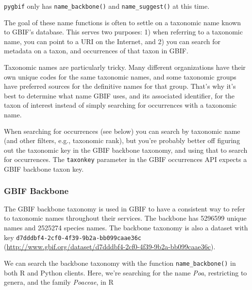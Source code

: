 \documentclass[author-year, review, 11pt]{components/elsarticle} %
\newenvironment{Shaded}{\begin{snugshade}}{\end{snugshade}}
\newcommand{\KeywordTok}[1]{\textcolor[rgb]{0.13,0.29,0.53}{\textbf{{#1}}}}
\newcommand{\DataTypeTok}[1]{\textcolor[rgb]{0.13,0.29,0.53}{{#1}}}
\newcommand{\StringTok}[1]{\textcolor[rgb]{0.31,0.60,0.02}{{#1}}}
\newcommand{\CommentTok}[1]{\textcolor[rgb]{0.56,0.35,0.01}{\textit{{#1}}}}
\newcommand{\NormalTok}[1]{{#1}}
\begin{document}
\texttt{pygbif} only has \texttt{name\_backbone()} and
\texttt{name\_suggest()} at this time.

The goal of these name functions is often to settle on a taxonomic name
known to GBIF's database. This serves two purposes: 1) when referring to
a taxonomic name, you can point to a URI on the Internet, and 2) you can
search for metadata on a taxon, and occurrences of that taxon in GBIF.

Taxonomic names are particularly tricky. Many different organizations
have their own unique codes for the same taxonomic names, and some
taxonomic groups have preferred sources for the definitive names for
that group. That's why it's best to determine what name GBIF uses, and
its associated identifier, for the taxon of interest instead of simply
searching for occurrences with a taxonomic name.

When searching for occurrences (see below) you can search by taxonomic
name (and other filters, e.g., taxonomic rank), but you're probably
better off figuring out the taxonomic key in the GBIF backbone taxonomy,
and using that to search for occurrences. The \texttt{taxonkey}
parameter in the GBIF occurrences API expects a GBIF backbone taxon key.

\subsubsection{GBIF Backbone}\label{gbif-backbone}

The GBIF backbone taxonomy is used in GBIF to have a consistent way to
refer to taxonomic names throughout their services. The backbone has
5296599 unique names and 2525274 species names. The backbone taxonomy is
also a dataset with key \texttt{d7dddbf4-2cf0-4f39-9b2a-bb099caae36c}
(\url{http://www.gbif.org/dataset/d7dddbf4-2cf0-4f39-9b2a-bb099caae36c}).

We can search the backbone taxonomy with the function
\texttt{name\_backbone()} in both R and Python clients. Here, we're
searching for the name \emph{Poa}, restricting to genera, and the family
\emph{Poaceae}, in R

\begin{Shaded}
\end{Shaded}
\end{document}
